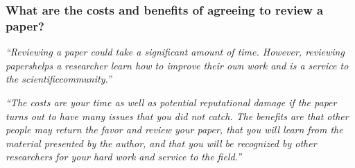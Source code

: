 \documentclass[12pt]{beamer}
\newcommand\ans[1]{{\it ``#1''}}
\newcommand\gap{\vspace{5mm}}
\begin{document}
\begin{frame}  %
  \frametitle{ What are the costs and benefits of agreeing to review a paper?}


  \ans{Reviewing a paper could take a significant amount of time.  However, reviewing papershelps a researcher learn how to improve their own work and is a service to the scientificcommunity.}

  \gap
  
  \ans{The costs are your time as well as potential reputational damage if the paper turns out to have many issues that you did not catch.  The benefits are that other people may return the favor and review your paper, that you will learn from the material presented by the author, and that you will be recognized by other researchers for your hard work and service to the field.}

\end{frame}
\end{document}
